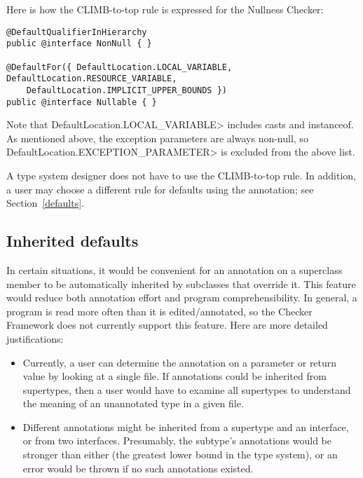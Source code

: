 Here is how the CLIMB-to-top rule is expressed for the Nullness Checker:

\begin{Verbatim}
@DefaultQualifierInHierarchy
public @interface NonNull { }

@DefaultFor({ DefaultLocation.LOCAL_VARIABLE, DefaultLocation.RESOURCE_VARIABLE,
    DefaultLocation.IMPLICIT_UPPER_BOUNDS })
public @interface Nullable { }
\end{Verbatim}

\noindent
Note that \<DefaultLocation.LOCAL\_VARIABLE> includes casts and instanceof.
 As mentioned above, the exception parameters are always non-null, so
\<DefaultLocation.EXCEPTION\_PARAMETER> is excluded from the above list.

A type system designer does not have to use the CLIMB-to-top rule.  In
addition, a user may choose a different rule for defaults using the
 annotation; see
Section~\ref{defaults}.


\subsection{Inherited defaults\label{inherited-defaults}}

In certain situations, it would be convenient for an annotation on a
superclass member to be automatically inherited by subclasses that override
it.  This feature would reduce both annotation effort and program
comprehensibility.  In general, a program is read more often than it is
edited/annotated, so the Checker Framework does not currently support this
feature.  Here are more detailed justifications:

\begin{itemize}

\item
  Currently, a user can determine the annotation on a parameter or return
  value by looking at a single file.  If annotations could be inherited
  from supertypes, then a user would have to examine all supertypes to
  understand the meaning of an unannotated type in a given file.

\item
  Different annotations might be inherited from a supertype and an
  interface, or from two interfaces.  Presumably, the subtype's annotations
  would be stronger than either (the greatest lower bound in the type
  system), or an error would be thrown if no such annotations existed.

\end{itemize}

